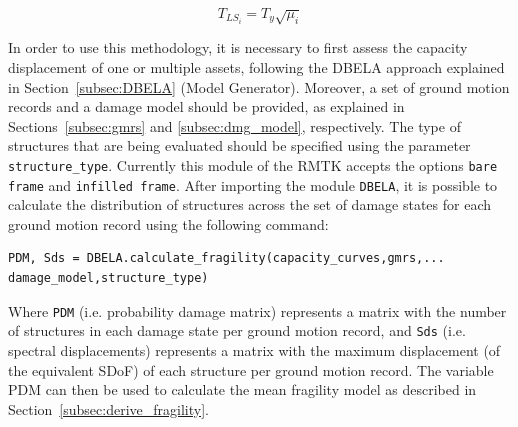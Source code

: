 \begin{equation}
T_{LS_i} = T_y\sqrt{\mu_{i}}
\end{equation}

In order to use this methodology, it is necessary to first assess the capacity displacement of one or multiple assets, following the DBELA approach explained in Section~\ref{subsec:DBELA} (Model Generator). Moreover, a set of ground motion records and a damage model should be provided, as explained in Sections~\ref{subsec:gmrs} and \ref{subsec:dmg_model}, respectively. The type of structures that are being evaluated should be specified using the parameter \verb=structure_type=. Currently this module of the RMTK accepts the options \verb=bare frame= and \verb=infilled frame=. After importing the module \verb=DBELA=, it is possible to calculate the distribution of structures across the set of damage states for each ground motion record using the following command:

\begin{Verbatim}[frame=single, commandchars=\\\{\}, samepage=true]
PDM, Sds = DBELA.calculate_fragility(capacity_curves,gmrs,...
damage_model,structure_type)
\end{Verbatim}

Where \verb=PDM= (i.e. probability damage matrix) represents a matrix with the number of structures in each damage state per ground motion record, and \verb=Sds= (i.e. spectral displacements) represents a matrix with the maximum displacement (of the equivalent SDoF) of each structure per ground motion record. The variable PDM can then be used to calculate the mean fragility model as described in Section~\ref{subsec:derive_fragility}.